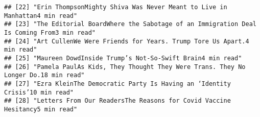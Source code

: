 \documentclass[
]{article}
\begin{document}
\begin{verbatim}
## [22] "Erin ThompsonMighty Shiva Was Never Meant to Live in Manhattan4 min read"                                                                                                                                                                                                                                                                                                                                             
## [23] "The Editorial BoardWhere the Sabotage of an Immigration Deal Is Coming From3 min read"                                                                                                                                                                                                                                                                                                                                
## [24] "Art CullenWe Were Friends for Years. Trump Tore Us Apart.4 min read"                                                                                                                                                                                                                                                                                                                                                  
## [25] "Maureen DowdInside Trump’s Not-So-Swift Brain4 min read"                                                                                                                                                                                                                                                                                                                                                              
## [26] "Pamela PaulAs Kids, They Thought They Were Trans. They No Longer Do.18 min read"                                                                                                                                                                                                                                                                                                                                      
## [27] "Ezra KleinThe Democratic Party Is Having an ‘Identity Crisis’10 min read"                                                                                                                                                                                                                                                                                                                                             
## [28] "Letters From Our ReadersThe Reasons for Covid Vaccine Hesitancy5 min read"                                                                                                                                                                                                                                                                                                                                            

\end{verbatim}
\end{document}
